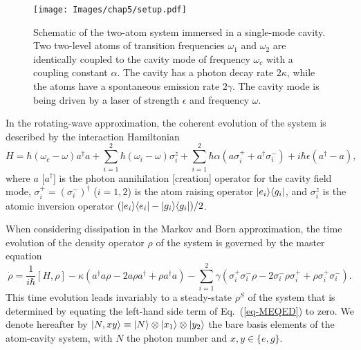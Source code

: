 \begin{figure}
    \center
    \texttt{[image: Images/chap5/setup.pdf]}
    \caption[Schematic of the two-atom system]{Schematic of the two-atom system immersed in a single-mode cavity. Two two-level atoms of transition frequencies $\omega_1$ and $\omega_2$ are identically coupled to the cavity mode of frequency $\omega_c$ with a coupling constant $\alpha$. The cavity has a photon decay rate $2\kappa$, while the atoms have a spontaneous emission rate $2\gamma$. The cavity mode is being driven by a laser of strength $\epsilon$ and frequency $\omega$.}
    \label{fig-setup}
\end{figure}

In the rotating-wave approximation, the coherent evolution of the system is described by the interaction Hamiltonian
\[ H = \hbar (\omega_c - \omega) a^\dagger a + \sum_{i=1}^2 \hbar (\omega_i-\omega) \sigma^{z}_i + \sum_{i=1}^2 \hbar \alpha (a \sigma^+_i+a^\dagger \sigma^-_i) + i \hbar \epsilon(a^\dagger - a) , \label{eq-H}\]
where $a$ [$a^\dagger$] is the photon annihilation [creation] operator for the cavity field mode, $\sigma_i^+ = (\sigma_i^-)^{\dagger}$ ($i = 1,2$) is the atom raising operator $| e_i \rangle \langle g_i |$, and $\sigma_i^z$ is the atomic inversion operator $(| e_i \rangle \langle e_i |-| g_i \rangle \langle g_i |)/2$.

When considering dissipation in the Markov and Born approximation, the time evolution of the density operator $\rho$ of the system is governed by the master equation~\cite{Aga74}
\[ \dot \rho= \frac{1}{i \hbar} [H,\rho] - \kappa(a^\dagger a  \rho - 2 a\rho a^\dagger +\rho a^\dagger a )  -  \sum_{i=1}^2 \gamma (\sigma_i^+ \sigma_i^-  \rho - 2 \sigma_i^-\rho \sigma_i^+ + \rho \sigma_i^+ \sigma_i^- ).
    \label{eq-MEQED}\]
This time evolution leads invariably to a steady-state $\rho^S$ of the system that is determined by equating the left-hand side term of Eq.~(\ref{eq-MEQED}) to zero. We denote hereafter by $| N,xy \rangle \equiv | N \rangle \otimes | x_1 \rangle \otimes | y_2 \rangle$ the bare basis elements of the atom-cavity system, with $N$ the photon number and $x,y \in \{e,g\}$.

